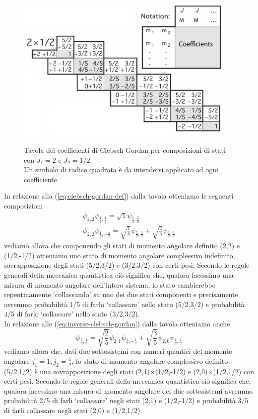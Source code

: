 \begin{figure}
    \centering
    \includegraphics{../figs/clebsch-gordan-table}
    \caption{Tavola dei coefficienti di Clebsch-Gordan per composizioni di stati con
        $J_1=2$ e $ J_2 = 1/2$. \\
        Un simbolo di radice quadrata è da intendersi applicato ad ogni coefficiente.}
    \label{fig:clebsch-gordan-table}
\end{figure}

In relazione alla (\ref{eq:clebsch-gordan-def}) dalla tavola otteniamo le seguenti composizioni
\begin{gather*}
    \psi_{2,2}\psi_{\frac{1}{2}, \frac{1}{2}} = \sqrt{ 1 } \psi_{\frac{5}{2}, \frac{5}{2}}\\
    \psi_{2,2}\psi_{\frac{1}{2},- \frac{1}{2}} = \sqrt{ \frac{1}{5} } \psi_{\frac{5}{2}, \frac{3}{2}} + \sqrt{ \frac{4}{5} } \psi_{\frac{3}{2}, \frac{3}{2}}
\end{gather*}
vediamo allora che componendo gli stati di momento angolare definito (2,2) e (1/2,-1/2) otteniamo uno stato di momento angolare complessivo indefinito, sovrapposizione degli stati (5/2,3/2) e (3/2,3/2) con certi pesi.
Secondo le regole generali della meccanica quantistica ciò significa che, qualora facessimo una misura di momento angolare dell’intero sistema,
lo stato cambierebbe repentinamente ‘collassando’ su uno dei due stati componenti e precisamente avremmo probabilità 1/5 di
farlo ‘collassare’ nello stato (5/2,3/2) e probabilità 4/5 di farlo ‘collassare’ nello stato (3/2,3/2). \\
In relazione alle (\ref{eq:inverse-clebsch-gordan}) dalla tavola otteniamo anche
\[
\psi_{\frac{5}{2}, \frac{1}{2}} = \sqrt{ \frac{2}{5} } \psi_{2,1}\psi_{\frac{1}{2}, - \frac{1}{2}} + \sqrt{ \frac{3}{5} } \psi_{2,0}\psi_{\frac{1}{2}, \frac{1}{2}}
\]
vediamo allora che, dati due sottosistemi con numeri quantici del momento angolare $j_{1}=1, j_{2}=\frac{1}{2}$, lo stato di momento angolare complessivo definito (5/2,1/2) è una sovrapposizione degli stati (2,1)$\times$(1/2,-1/2) e (2,0)$\times$(1/2,1/2) con certi pesi.
Secondo le regole generali della meccanica quantistica ciò significa che, qualora facessimo una misura di momento angolare dei due sottosistemi avremmo probabilità 2/5 di farli ‘collassare’ negli stati (2,1) e (1/2,-1/2) e probabilità 3/5 di farli collassare negli stati (2,0) e (1/2,1/2).
\bigskip

